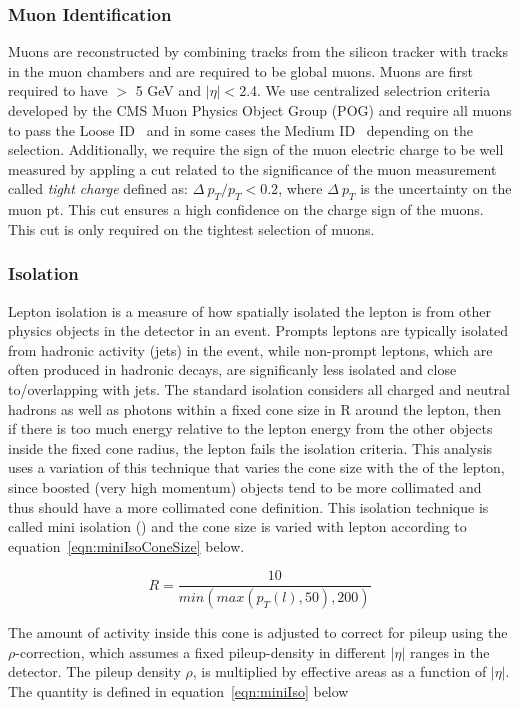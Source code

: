 \subsubsection{Muon Identification}
Muons are reconstructed by combining tracks from the silicon tracker with tracks in the muon chambers and are required to be global muons. Muons are first required to have \pt $>$ 5 GeV and
$|\eta|<$2.4. We use centralized selectrion criteria developed by the CMS
Muon Physics Object Group (POG) and require all muons to pass the Loose ID~\cite{loosemuon} and in some cases the Medium ID~\cite{mediummuon} depending on the selection. Additionally, we require
the sign of the muon electric charge to be well measured by appling a cut related to the significance of the muon \pt measurement called \emph{tight charge} defined as: $\Delta~p_{T}/p_{T} < 0.2$,
where $\Delta~p_{T}$ is the uncertainty on the muon pt. This cut ensures a high confidence on the charge sign of the muons. This cut is only required on the tightest selection of muons.  

\subsubsection{Isolation}
Lepton isolation is a measure of how spatially isolated the lepton is from other physics objects in the detector in an event. Prompts leptons are typically isolated from hadronic activity
(jets) in the event, while non-prompt leptons, which are often produced in hadronic decays, are significanly less isolated and close to/overlapping with jets. The standard isolation considers
all charged and neutral hadrons as well as photons within a fixed cone size in R around the lepton, then if there is too much energy relative to the lepton energy from the
other objects inside the fixed cone radius, the lepton fails the isolation criteria. This analysis uses a variation of this technique that varies the cone size with the \pt of the lepton, since
boosted (very high momentum) objects tend to be more collimated and thus should have a more collimated cone definition. This isolation technique is called mini isolation (\miniIso) and the cone
size is varied with lepton \pt according to equation~\ref{eqn:miniIsoConeSize} below. 

\begin{equation}
\label{eqn:miniIsoConeSize}
 R = \frac{10}{min(max(p_{T}(l),50),200)}
\end{equation}

\noindent The amount of activity inside this cone is adjusted to correct for pileup using the $\rho$-correction, which assumes a fixed pileup-density in different $|\eta|$ ranges in the detector. The
pileup density $\rho$, is multiplied by effective areas as a function of $|\eta|$. The \miniIso quantity is defined in equation~\ref{eqn:miniIso} below

